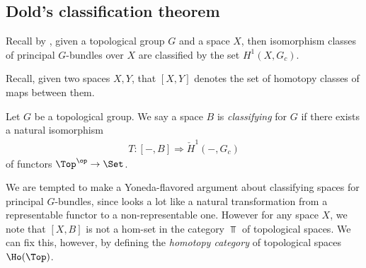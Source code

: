 \documentclass[11pt]{amsart}
\begin{document}
\subsection{Dold's classification theorem}

Recall by , given a topological group $G$ and a space $X$, then isomorphism classes of principal $G$-bundles over $X$ are classified by the set $H^1(X,G_c)$.

\begin{notation} Recall, given two spaces $X,Y$, that $[X,Y]$ denotes the set of homotopy classes of maps between them.
\end{notation}

\begin{definition}
\label{def:classifying-space}
Let $G$ be a topological group. We say a space $B$ is \emph{classifying} for $G$ if there exists a natural isomorphism
\begin{equation}\label{eqn:dold-classifying-nat-trans}
\begin{aligned}
    T \colon [-,B] \Rightarrow \check{H}^1(-,G_c)
\end{aligned}
\end{equation}
of functors $\Top^\op \to \Set$.
\end{definition}

\begin{remark} We are tempted to make a Yoneda-flavored argument about classifying spaces for principal $G$-bundles, since  looks a lot like a natural transformation from a representable functor to a non-representable one. However for any space $X$, we note that $[X,B]$ is not a hom-set in the category $\Top$ of topological spaces. We can fix this, however, by defining the \emph{homotopy category} of topological spaces $\Ho(\Top)$.
\end{remark}
\end{document}
